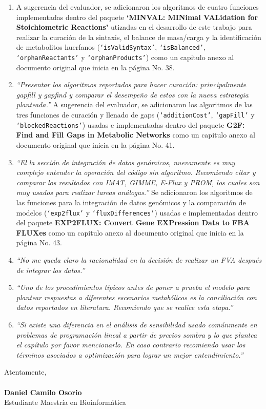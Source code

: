 \documentclass[11pt,a4paper]{article}
\begin{document}
\begin{enumerate}
\item A sugerencia del evaluador, se adicionaron los algoritmos de cuatro funciones implementadas dentro del paquete \textbf{`MINVAL: MINimal VALidation for Stoichiometric Reactions'} utizadas en el desarrollo de este trabajo para realizar la curación de la sintaxis, el balance de masa/carga y  la identificación de metabolitos huerfanos (\texttt{`isValidSyntax'}, \texttt{`isBalanced'}, \texttt{`orphanReactants'} y \texttt{`orphanProducts'}) como un capitulo anexo al documento original que inicia en la página No. 38.

\item \emph{``Presentar los algoritmos reportados para hacer curación: principalmente gapfill y gapfind y comparar el desempeño de estos con la nueva estrategia planteada.''} A sugerencia del evaluador, se adicionaron los algoritmos de las tres funciones de curación y llenado de gaps  (\texttt{`additionCost'}, \texttt{`gapFill'} y \texttt{`blockedReactions'}) usadas e implementadas dentro del paquete \textbf{G2F: Find and Fill Gaps in Metabolic Networks} como un capitulo anexo al documento original que inicia en la página No. 41.

\item \emph{``El la sección de integración de datos genómicos, nuevamente es muy complejo entender la operación del código sin algoritmo. Recomiendo citar y comparar los resultados con IMAT, GIMME, E-Flux y PROM, los cuales son muy usados para realizar tareas análogas.''} Se adicionaron los algoritmos de las funciones para la integración de datos genómicos y la comparación de modelos  (\texttt{`exp2flux'} y \texttt{`fluxDifferences'}) usadas e implementadas dentro del paquete \textbf{EXP2FLUX: Convert Gene EXPression Data to FBA FLUXes} como un capitulo anexo al documento original que inicia en la página No. 43.

\item \emph{``No me queda claro la racionalidad en la decisión de realizar un FVA después de integrar los datos.''}

\item \emph{``Uno de los procedimientos típicos antes de poner a prueba el modelo para plantear respuestas a diferentes escenarios metabólicos es la conciliación con datos reportados en literatura. Recomiendo que se realice esta etapa.''}

\item \emph{``Si existe una diferencia en el análisis de sensibilidad usado comúnmente en problemas de programación lineal a partir de precios sombra y lo que plantea el capítulo por favor mencionarlo. En caso contrario recomiendo usar los términos asociados a optimización para lograr un mejor entendimiento.''}

\end{enumerate}
Atentamente,\\
\\
\textbf{Daniel Camilo Osorio}\\
Estudiante Maestría en Bioinformática
\end{document}
